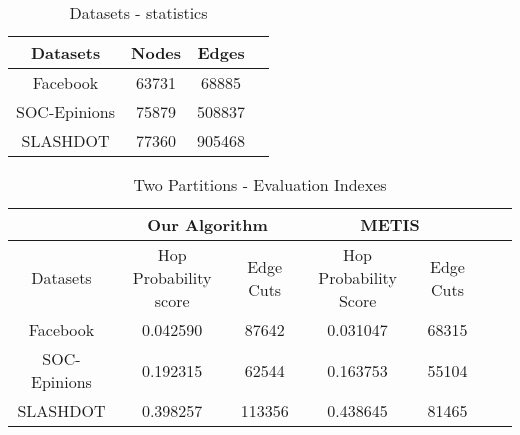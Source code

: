 \documentclass[letterpaper]{article}
\begin{document}
\begin{table*}[htb]
\centering
\caption{Datasets - statistics}
\begin{tabular}{|c|c|c|c|}
\hline
 Datasets& Nodes & Edges \\
\hline
Facebook& 63731 & 68885  \\
\hline
SOC-Epinions & 75879 & 508837   \\
\hline
SLASHDOT& 77360 & 905468  \\
\hline
\end{tabular}

\label{fig:twopartcuts}
\end{table*}
\begin{table*}[htb]
\centering
\caption{Two Partitions - Evaluation Indexes}
\begin{tabular}{|c|c|c|c|c|c|c|}
\hline
 &\multicolumn{2}{c|}{Our Algorithm}&\multicolumn{2}{c|}{METIS}\\
\hline
 Datasets&Hop Probability score &Edge Cuts&Hop Probability Score&Edge Cuts\\
\hline
Facebook& 0.042590 & 87642  & 0.031047 & 68315\\
\hline
SOC-Epinions & 0.192315 & 62544  & 0.163753 & 55104\\
\hline
SLASHDOT& 0.398257 & 113356  & 0.438645 & 81465 \\
\hline
\end{tabular}
\label{fig:twopartindex}
\end{table*}
\end{document}
